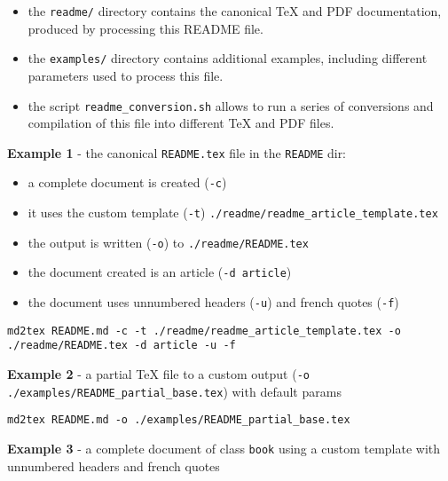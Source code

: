 \documentclass[a4paper, 12pt, twoside]{book}
\begin{document}
\begin{itemize}
\item the \texttt{readme/} directory contains the canonical TeX and PDF documentation, produced by processing this README file.
\item the \texttt{examples/} directory contains additional examples, including different parameters used to process this file.
\item the script \texttt{readme\_conversion.sh} allows to run a series of conversions and compilation of this file into different TeX and PDF files. 
\end{itemize}

\textbf{Example 1} - the canonical \texttt{README.tex} file in the \texttt{README} dir:

\begin{itemize}
\item a complete document is created (\texttt{-c})
\item it uses the custom template (\texttt{-t}) \texttt{./readme/readme\_article\_template.tex}
\item the output is written (\texttt{-o}) to \texttt{./readme/README.tex}
\item the document created is an article (\texttt{-d article})
\item the document uses unnumbered headers (\texttt{-u}) and french quotes (\texttt{-f}) 
\end{itemize}

\begin{listing}[h!]
   \begin{verbatim}
md2tex README.md -c -t ./readme/readme_article_template.tex -o ./readme/README.tex -d article -u -f

   \end{verbatim}
\end{listing}

\textbf{Example 2} - a partial TeX file to a custom output (\texttt{-o ./examples/README\_partial\_base.tex}) with default params

\begin{listing}[h!]
   \begin{verbatim}
md2tex README.md -o ./examples/README_partial_base.tex

   \end{verbatim}
\end{listing}

\textbf{Example 3} - a complete document of class \texttt{book} using a custom template with unnumbered headers and french quotes
\end{document}
